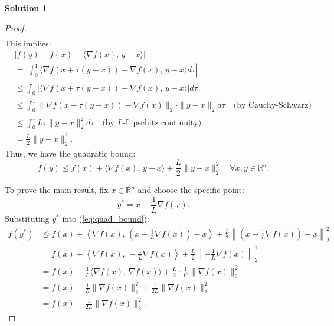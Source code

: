 \documentclass[12pt]{article}
\theoremstyle{definition}
\newtheorem*{solution}{\normalfont\textbf{Solution}}
\begin{document}
\begin{enumerate}[leftmargin=*]
\begin{solution}
\begin{proof}
\begin{align*}
                \end{align*}
                This implies:
                \begin{align*}
                &\left| f(y) - f(x) - \langle \nabla f(x),\, y - x \rangle \right| \\
                &= \left| \int_0^1 \langle \nabla f(x + \tau(y - x)) - \nabla f(x),\, y - x \rangle  d\tau \right| \\
                &\leq \int_0^1 \left| \langle \nabla f(x + \tau(y - x)) - \nabla f(x),\, y - x \rangle \right|  d\tau \\
                &\leq \int_0^1 \| \nabla f(x + \tau(y - x)) - \nabla f(x) \|_2 \cdot \| y - x \|_2  d\tau \quad \text{(by Cauchy-Schwarz)} \\
                &\leq \int_0^1 L \tau \| y - x \|_2^2  d\tau \quad \text{(by $L$-Lipschitz continuity)} \\
                &= \frac{L}{2} \| y - x \|_2^2.
                \end{align*}
                Thus, we have the quadratic bound:
                \begin{equation}
                f(y) \leq f(x) + \langle \nabla f(x),\, y - x \rangle + \frac{L}{2} \| y - x \|_2^2 \quad \forall x, y \in \mathbb{R}^n. \label{eq:quad_bound}
                \end{equation}

                To prove the main result, fix $x \in \mathbb{R}^n$ and choose the specific point:
                \[
                y^* = x - \frac{1}{L} \nabla f(x).
                \]
                Substituting $y^*$ into (\ref{eq:quad_bound}):
                \begin{align*}
                f(y^*) 
                &\leq f(x) + \left\langle \nabla f(x),\, \left( x - \frac{1}{L} \nabla f(x) \right) - x \right\rangle + \frac{L}{2} \left\| \left( x - \frac{1}{L} \nabla f(x) \right) - x \right\|_2^2 \\
                &= f(x) + \left\langle \nabla f(x),\, -\frac{1}{L} \nabla f(x) \right\rangle + \frac{L}{2} \left\| -\frac{1}{L} \nabla f(x) \right\|_2^2 \\
                &= f(x) - \frac{1}{L} \langle \nabla f(x),\, \nabla f(x) \rangle + \frac{L}{2} \cdot \frac{1}{L^2} \| \nabla f(x) \|_2^2 \\
                &= f(x) - \frac{1}{L} \| \nabla f(x) \|_2^2 + \frac{1}{2L} \| \nabla f(x) \|_2^2 \\
                &= f(x) - \frac{1}{2L} \| \nabla f(x) \|_2^2.
                \end{align*}


\end{proof}
\end{solution}
\end{enumerate}
\end{document}
